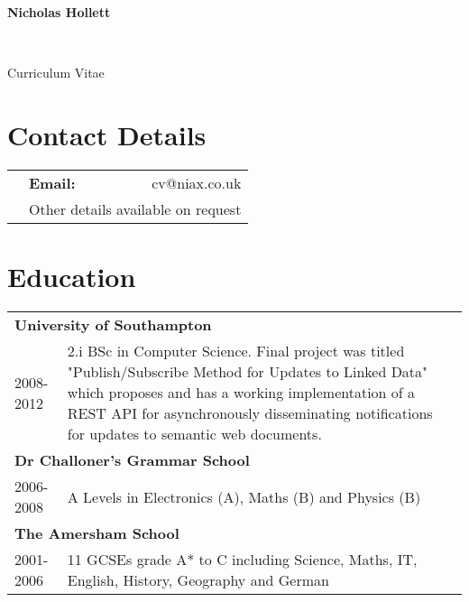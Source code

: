 \documentclass[11pt]{report}
\begin{document}
\pagestyle{empty}
\begin{center}
\begin{LARGE}
{\bf Nicholas Hollett}
\end{LARGE}\\[3pt]
\begin{large}
Curriculum Vitae
\end{large}
\end{center}
\section*{Contact Details}
\begin{center}
\begin{tabular*}{200pt}{ l@{\extracolsep{\fill}} l  r@{\extracolsep{\fill}} }
 & {\bf Email:} & cv@niax.co.uk \\
 & \multicolumn{2}{c}{Other details available on request}
\end{tabular*}
\end{center}
\section*{Education}
\begin{tabularx}{\textwidth}{ l X }
\multicolumn{2}{l}{\bf University of Southampton} \\
2008-2012 & 
2.i BSc in Computer Science.
Final project was titled "Publish/Subscribe Method for Updates to Linked Data" which proposes and has a working implementation of a REST API for asynchronously disseminating notifications for updates to semantic web documents.  \\
\multicolumn{2}{l}{\bf Dr Challoner's Grammar School} \\
2006-2008 & A Levels in Electronics (A), Maths (B) and Physics (B) \\
\multicolumn{2}{l}{\bf The Amersham School} \\
2001-2006 & 11 GCSEs grade A* to C including Science, Maths, IT, English, History, Geography and German
\end{tabularx}
\end{document}
